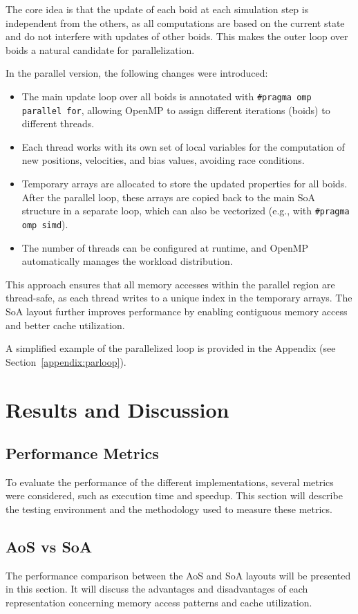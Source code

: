 \documentclass[10pt,twocolumn,letterpaper]{article}
\begin{document}
The core idea is that the update of each boid at each simulation step is independent from the others, as all computations are based on the current state and do not interfere with updates of other boids. This makes the outer loop over boids a natural candidate for parallelization.

In the parallel version, the following changes were introduced:
\begin{itemize}
    \item The main update loop over all boids is annotated with \texttt{\#pragma omp parallel for}, allowing OpenMP to assign different iterations (boids) to different threads.
    \item Each thread works with its own set of local variables for the computation of new positions, velocities, and bias values, avoiding race conditions.
    \item Temporary arrays are allocated to store the updated properties for all boids. After the parallel loop, these arrays are copied back to the main SoA structure in a separate loop, which can also be vectorized (e.g., with \texttt{\#pragma omp simd}).
    \item The number of threads can be configured at runtime, and OpenMP automatically manages the workload distribution.
\end{itemize}

This approach ensures that all memory accesses within the parallel region are thread-safe, as each thread writes to a unique index in the temporary arrays. The SoA layout further improves performance by enabling contiguous memory access and better cache utilization.

A simplified example of the parallelized loop is provided in the Appendix (see Section~\ref{appendix:parloop}).

\section{Results and Discussion}

\subsection{Performance Metrics}
To evaluate the performance of the different implementations, several metrics were considered, such as execution time and speedup. This section will describe the testing environment and the methodology used to measure these metrics.

\subsection{AoS vs SoA}
The performance comparison between the AoS and SoA layouts will be presented in this section. It will discuss the advantages and disadvantages of each representation concerning memory access patterns and cache utilization.
\end{document}
